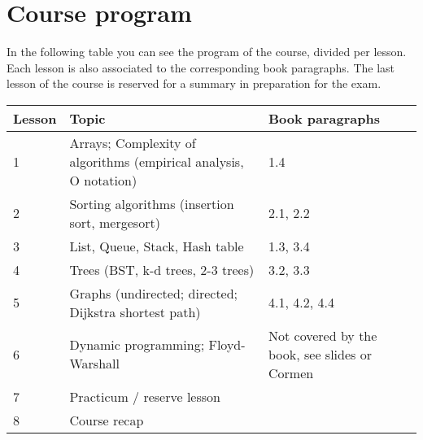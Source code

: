 \section{Course program}
	
	In the following table you can see the program of the course, divided per lesson. Each lesson is also associated to the corresponding book paragraphs. The last lesson of the course is reserved for a summary in preparation for the exam. \\
	
	\begin{tabular}{ | p{1.2cm} | p{10cm} | p{3.7cm} | }
		\hline
	  	\textbf{Lesson} & \textbf{Topic} & \textbf{Book paragraphs} \\
	  	\hline
  		1 & Arrays; Complexity of algorithms (empirical analysis, O notation) & 1.4 \\
  		\hline
  		2 & Sorting algorithms (insertion sort, mergesort) & 2.1, 2.2 \\
  		\hline
  		3 & List, Queue, Stack, Hash table & 1.3, 3.4 \\
  		\hline
  		4 & Trees (BST, k-d trees, 2-3 trees) & 3.2, 3.3 \\
  		\hline
  		5 & Graphs (undirected; directed; Dijkstra shortest path) & 4.1, 4.2, 4.4 \\
  		\hline
  		6 & Dynamic programming; Floyd-Warshall & Not covered by the book, see slides or Cormen\\
  		\hline
  		7 & Practicum / reserve lesson & \\
  		\hline
  		8 & Course recap & \\
  		\hline
	\end{tabular}
\begin{comment}
  		4 & Binary search trees & 3.2 \\
  		\hline
  		5 & Balanced search trees: 2-3 search trees & 3.3 \\
  		\hline
  		6 & Graphs (undirected; directed; Dijkstra shortest path) & 4.1, 4.2, 4.4 \\
  		\hline
  		7 & Dynamic programming; Floyd-Warshall & Not covered by the book, see slides or Cormen\\
  		\hline
  		8 & Course recap & \\
  		\hline
\end{comment}
